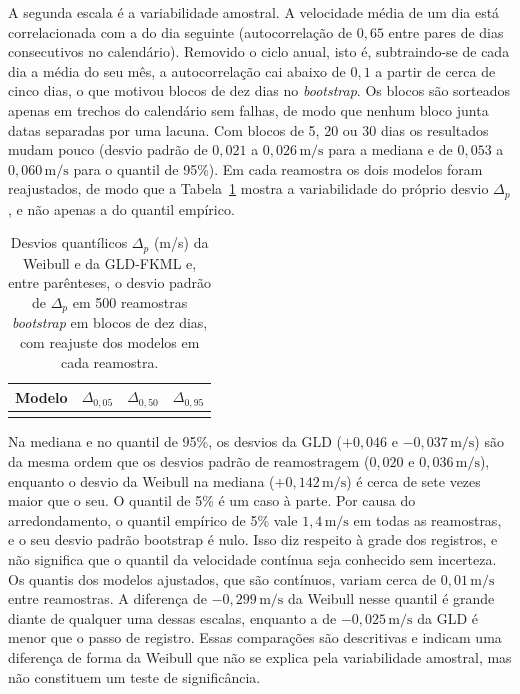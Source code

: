 A segunda escala é a variabilidade amostral. A velocidade média de um dia está correlacionada com a do dia seguinte (autocorrelação de $0{,}65$ entre pares de dias consecutivos no calendário). Removido o ciclo anual, isto é, subtraindo-se de cada dia a média do seu mês, a autocorrelação cai abaixo de $0{,}1$ a partir de cerca de cinco dias, o que motivou blocos de dez dias no \textit{bootstrap}. Os blocos são sorteados apenas em trechos do calendário sem falhas, de modo que nenhum bloco junta datas separadas por uma lacuna. Com blocos de 5, 20 ou 30 dias os resultados mudam pouco (desvio padrão de $0{,}021$ a $0{,}026\,\text{m/s}$ para a mediana e de $0{,}053$ a $0{,}060\,\text{m/s}$ para o quantil de 95\%). Em cada reamostra os dois modelos foram reajustados, de modo que a Tabela~\ref{tab:incerteza_vento} mostra a variabilidade do próprio desvio $\Delta_p$, e não apenas a do quantil empírico.\par



\begin{table}[htbp]
\centering
\caption{Desvios quantílicos $\Delta_p$ (m/s) da Weibull e da GLD-FKML e, entre parênteses, o desvio padrão de $\Delta_p$ em 500 reamostras \textit{bootstrap} em blocos de dez dias, com reajuste dos modelos em cada reamostra.}
\label{tab:incerteza_vento}
\begin{tabular}{lccc}
\toprule
\textbf{Modelo} & \textbf{$\Delta_{0,05}$} & \textbf{$\Delta_{0,50}$} & \textbf{$\Delta_{0,95}$} \\
\midrule
\unskip \\
\bottomrule
\end{tabular}
\end{table}

Na mediana e no quantil de 95\%, os desvios da GLD ($+0{,}046$ e $-0{,}037\,\text{m/s}$) são da mesma ordem que os desvios padrão de reamostragem ($0{,}020$ e $0{,}036\,\text{m/s}$), enquanto o desvio da Weibull na mediana ($+0{,}142\,\text{m/s}$) é cerca de sete vezes maior que o seu. O quantil de 5\% é um caso à parte. Por causa do arredondamento, o quantil empírico de 5\% vale $1{,}4\,\text{m/s}$ em todas as reamostras, e o seu desvio padrão bootstrap é nulo. Isso diz respeito à grade dos registros, e não significa que o quantil da velocidade contínua seja conhecido sem incerteza. Os quantis dos modelos ajustados, que são contínuos, variam cerca de $0{,}01\,\text{m/s}$ entre reamostras. A diferença de $-0{,}299\,\text{m/s}$ da Weibull nesse quantil é grande diante de qualquer uma dessas escalas, enquanto a de $-0{,}025\,\text{m/s}$ da GLD é menor que o passo de registro. Essas comparações são descritivas e indicam uma diferença de forma da Weibull que não se explica pela variabilidade amostral, mas não constituem um teste de significância.\par


